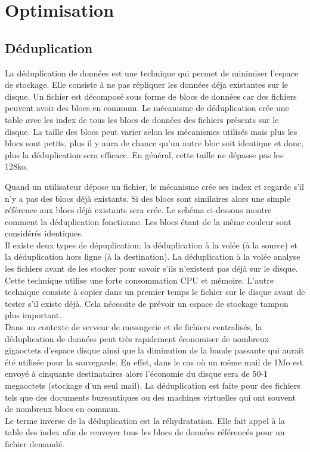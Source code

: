 \documentclass[a4paper,11pt]{report}
\begin{document}
\section{Optimisation}

\subsection{Déduplication}
La déduplication de données est une technique qui permet de minimiser l'espace de stockage. Elle consiste à ne pas répliquer les données déja existantes sur le disque. Un fichier est décomposé sous forme de blocs de données car des fichiers peuvent avoir des blocs en commum. Le mécanisme de déduplication crée une table avec les index de tous les blocs de données des fichiers présents sur le disque. La taille des blocs peut varier selon les mécanismes utilisés mais plus les blocs sont petits, plus il y aura de chance qu'un autre bloc soit identique et donc, plus la déduplication sera efficace. En général, cette taille ne dépasse pas les 128ko.
 
 Quand un utilisateur dépose un fichier, le mécanisme crée ses index et regarde s'il n'y a pas des blocs déjà existants. Si des blocs sont similaires alors une simple référence aux blocs déjà existants sera crée. Le schéma ci-dessous montre comment la déduplication fonctionne. Les blocs étant de la même couleur sont considérés identiques.\\

Il existe deux types de dépuplication: la déduplication à la volée (à la source) et la déduplication hors ligne (à la destination). La déduplication à la volée analyse les fichiers avant de les stocker pour savoir s'ils n'existent pas déjà sur le disque. Cette technique utilise une forte consommation CPU et mémoire. L'autre technique consiste à copier dans un premier temps le fichier sur le disque avant de tester s'il existe déjà. Cela nécessite de prévoir un espace de stockage tampon plus important. \\

Dans un contexte de serveur de messagerie et de fichiers centralisés, la déduplication de données peut très rapidement économiser de nombreux gigaoctets d'espace disque ainsi que la diminution de la bande passante qui aurait été utilisée pour la sauvegarde. En effet, dans le cas où un même mail de 1Mo est envoyé à cinquante destinataires alors l'économie du disque sera de 50-1 megaoctets (stockage d'un seul mail). La déduplication est faite pour des fichiers tels que des documents bureautiques ou des machines virtuelles qui ont souvent de nombreux blocs en commun.\\
Le terme inverse de la déduplication est la réhydratation. Elle fait appel à la table des index afin de renvoyer tous les blocs de données référencés pour un fichier demandé.\\
\end{document}
